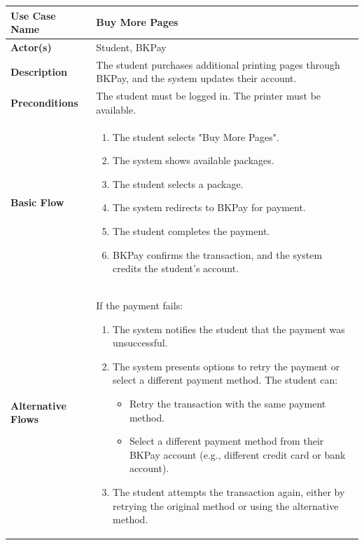 \documentclass[a4paper]{report}
\begin{document}
\begin{enumerate}
        \begin{table}[h!]
            \centering
            \renewcommand{\arraystretch}{1.8}
            \begin{tabular}{|>{\centering\arraybackslash}m{3cm}|>{\raggedright\arraybackslash}m{10cm}|}
            \hline
            \textbf{Use Case Name} & Buy More Pages \\ \hline
            \textbf{Actor(s)} & Student, BKPay \\ \hline
            \textbf{Description} & The student purchases additional printing pages through BKPay, and the system updates their account. \\ \hline
            \textbf{Preconditions} & The student must be logged in. The printer must be available. \\ \hline
            \textbf{Basic Flow} & 
            \begin{enumerate}
                \item The student selects "Buy More Pages".
                \item The system shows available packages.
                \item The student selects a package.
                \item The system redirects to BKPay for payment.
                \item The student completes the payment.
                \item BKPay confirms the transaction, and the system credits the student's account.
            \end{enumerate} \\ \hline
            \textbf{Alternative Flows} & 
            If the payment fails:
            \begin{enumerate}
                \item The system notifies the student that the payment was unsuccessful.
                \item The system presents options to retry the payment or select a different payment method. The student can:
                \begin{itemize}
                    \item Retry the transaction with the same payment method.
                    \item Select a different payment method from their BKPay account (e.g., different credit card or bank account).
                \end{itemize}
                \item The student attempts the transaction again, either by retrying the original method or using the alternative method.

\end{enumerate}
\end{tabular}
\end{table}
\end{enumerate}
\end{document}
